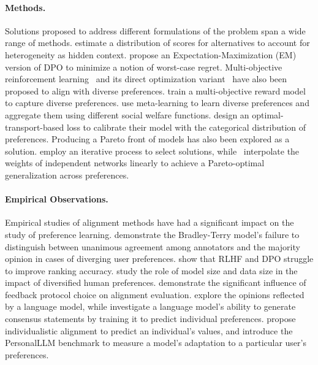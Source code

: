 \paragraph{Methods.} 
Solutions proposed to address different formulations of the problem span a wide range of methods. \citet{siththaranjan2023distributional} estimate a distribution of scores for alternatives to account for heterogeneity as hidden context. \citet{chidambaram2024direct} propose an Expectation-Maximization (EM) version of DPO to minimize a notion of worst-case regret. Multi-objective reinforcement learning~\citep{harland_adaptive_2024, jang_personalized_2023} and its direct optimization variant~\citep{zhou_beyond_2024} have also been proposed to align with diverse preferences. \citet{wang_arithmetic_2024} train a multi-objective reward model to capture diverse preferences. \citet{zhong_provable_2024} use meta-learning to learn diverse preferences and aggregate them using different social welfare functions. \citet{li_aligning_2024} design an optimal-transport-based loss to calibrate their model with the categorical distribution of preferences.
 Producing a Pareto front of models has also been explored as a solution. \citet{boldi_pareto-optimal_2024} employ an iterative process to select solutions, while~\citet{rame_rewarded_2023} interpolate the weights of independent networks linearly to achieve a Pareto-optimal generalization across preferences. 

\paragraph{Empirical Observations.} 
Empirical studies of alignment methods have had a significant impact on the study of preference learning. \citet{zhang_diverging_2024} demonstrate the Bradley-Terry model's failure to distinguish between unanimous agreement among annotators and the majority opinion in cases of diverging user preferences. \citet{chen_preference_2024} show that RLHF and DPO struggle to improve ranking accuracy. \citet{zeng_diversified_2024} study the role of model size and data size in the impact of diversified human preferences. \citet{bansal_peering_2024} demonstrate the significant influence of feedback protocol choice on alignment evaluation. \citet{santurkar_whose_2023} explore the opinions reflected by a language model, while \citet{bakker_fine-tuning_2022} investigate a language model's ability to generate consensus statements by training it to predict individual preferences. \citet{jiang_can_2024} propose individualistic alignment to predict an individual's values, and \citet{zollo_personalllm_2024} introduce the PersonalLLM benchmark to measure a model's adaptation to a particular user's preferences.

